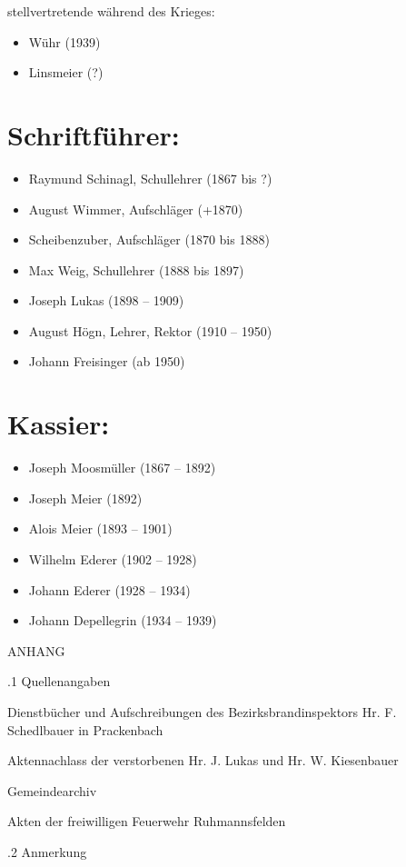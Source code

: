 \documentclass[12pt,a4paper]{book}
\begin{document}
stellvertretende während des Krieges:

\begin{itemize}
  \item Wühr (1939)
  \item Linsmeier (?)
\end{itemize}

\section{Schriftführer:}

\begin{itemize}
  \item Raymund Schinagl, Schullehrer (1867 bis ?)
  \item August Wimmer, Aufschläger (+1870)
  \item Scheibenzuber, Aufschläger (1870 bis 1888)
  \item Max Weig, Schullehrer (1888 bis 1897)
  \item Joseph Lukas (1898 – 1909)
  \item August Högn, Lehrer, Rektor (1910 – 1950)
  \item Johann Freisinger (ab 1950)
\end{itemize}

\section{Kassier:}

\begin{itemize}
  \item Joseph Moosmüller (1867 – 1892)
  \item Joseph Meier (1892)
  \item Alois Meier (1893 – 1901)
  \item Wilhelm Ederer (1902 – 1928)
  \item Johann Ederer (1928 – 1934)
  \item Johann Depellegrin (1934 – 1939)
\end{itemize}

ANHANG

.1 Quellenangaben

Dienstbücher und Aufschreibungen des Bezirksbrandinspektors Hr. F. Schedlbauer
in Prackenbach

Aktennachlass der verstorbenen Hr. J. Lukas und Hr. W. Kiesenbauer

Gemeindearchiv

Akten der freiwilligen Feuerwehr Ruhmannsfelden

.2 Anmerkung
\end{document}

